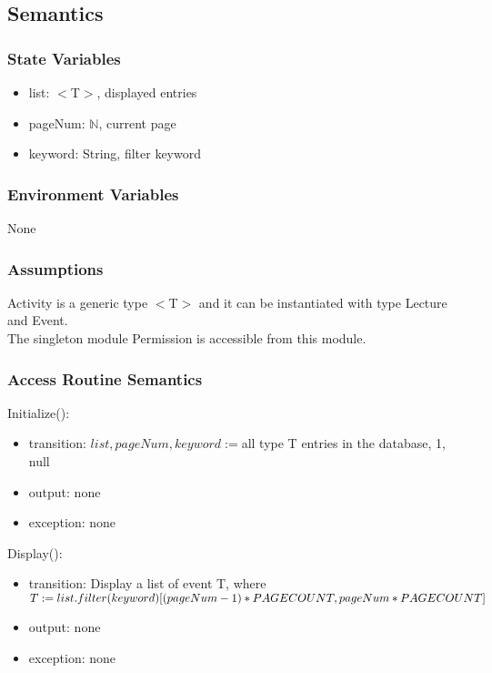 \documentclass[12pt, titlepage]{article}
\begin{document}
\subsection{Semantics}

\subsubsection{State Variables}

\begin{itemize}
\item list: $<$T$>$, displayed entries
\item pageNum: $\mathbb{N}$, current page
\item keyword: String, filter keyword
\end{itemize}

\subsubsection{Environment Variables}

None

\subsubsection{Assumptions}

Activity is a generic type $<$T$>$ and it can be instantiated with type Lecture and Event.\\
The singleton module Permission is accessible from this module.

\subsubsection{Access Routine Semantics}

\noindent Initialize():
\begin{itemize}
\item transition: $list, pageNum, keyword := $all type T entries in the database, 1, null
\item output: none
\item exception: none
\end{itemize}

\noindent Display():
\begin{itemize}
\item transition: Display a list of event T, where $T := \\list.filter(keyword)[(pageNum-1) * PAGECOUNT, pageNum * PAGECOUNT]$
\item output: none
\item exception: none
\end{itemize}
\end{document}
